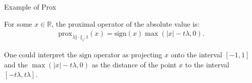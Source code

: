 \documentclass[11pt]{beamer}
\begin{document}
        \begin{frame}{Example of Prox}
            \begin{definition}
                For some $x \in \mathbb R$, the proximal operator of the absolute value is:
                \begin{align*}
                   \text{prox}_{\lambda \Vert\cdot \Vert_1, t}(x) = \text{sign}(x)\max(|x| - t\lambda , 0). 
                \end{align*}
            \end{definition}
            One could interpret the $\text{sign}$ operator as projecting $x$ onto the interval $[-1, 1]$ and the $\max(|x| - t\lambda , 0)$ as the distance of the point $x$ to the interval $[-t\lambda, t\lambda]$. 
        \end{frame}
        
\end{document}
